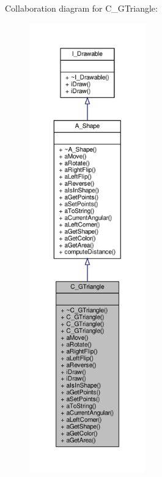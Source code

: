 Collaboration diagram for C\+\_\+\+G\+Triangle\+:\nopagebreak
\begin{figure}[H]
\begin{center}
\leavevmode
\includegraphics[height=550pt]{classC__GTriangle__coll__graph}
\end{center}
\end{figure}
